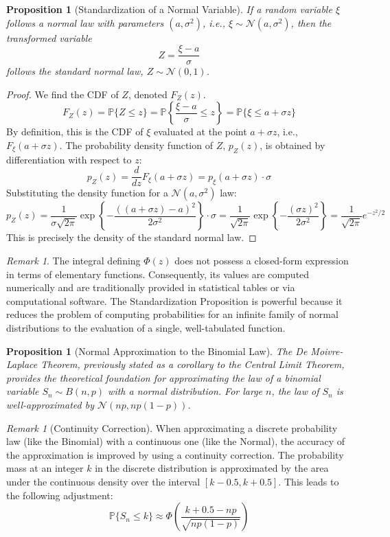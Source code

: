 \documentclass[12pt, openany]{book}
\theoremstyle{definition}
\theoremstyle{plain}
\newtheorem{proposition}[definition]{Proposition}
\theoremstyle{remark}
\newtheorem{remark}[definition]{Remark}
\newcommand{\probP}{\mathbb{P}}
\begin{document}
\begin{proposition}[Standardization of a Normal Variable]
If a random variable $\xi$ follows a normal law with parameters $(a, \sigma^2)$, i.e., $\xi \sim \mathcal{N}(a, \sigma^2)$, then the transformed variable
$$ Z = \frac{\xi - a}{\sigma} $$
follows the standard normal law, $Z \sim \mathcal{N}(0,1)$.
\end{proposition}
\begin{proof}
We find the CDF of $Z$, denoted $F_Z(z)$.
$$ F_Z(z) = \probP\{Z \le z\} = \probP\left\{\frac{\xi - a}{\sigma} \le z\right\} = \probP\{\xi \le a + \sigma z\} $$
By definition, this is the CDF of $\xi$ evaluated at the point $a + \sigma z$, i.e., $F_\xi(a + \sigma z)$. The probability density function of $Z$, $p_Z(z)$, is obtained by differentiation with respect to $z$:
$$ p_Z(z) = \frac{d}{dz} F_\xi(a + \sigma z) = p_\xi(a + \sigma z) \cdot \sigma $$
Substituting the density function for a $\mathcal{N}(a, \sigma^2)$ law:
$$ p_Z(z) = \frac{1}{\sigma\sqrt{2\pi}} \exp\left\{-\frac{((a+\sigma z)-a)^2}{2\sigma^2}\right\} \cdot \sigma = \frac{1}{\sqrt{2\pi}} \exp\left\{-\frac{(\sigma z)^2}{2\sigma^2}\right\} = \frac{1}{\sqrt{2\pi}} e^{-z^2/2} $$
This is precisely the density of the standard normal law.
\end{proof}

\begin{remark}
The integral defining $\Phi(z)$ does not possess a closed-form expression in terms of elementary functions. Consequently, its values are computed numerically and are traditionally provided in statistical tables or via computational software. The Standardization Proposition is powerful because it reduces the problem of computing probabilities for an infinite family of normal distributions to the evaluation of a single, well-tabulated function.
\end{remark}

\begin{proposition}[Normal Approximation to the Binomial Law]
The De Moivre-Laplace Theorem, previously stated as a corollary to the Central Limit Theorem, provides the theoretical foundation for approximating the law of a binomial variable $S_n \sim B(n,p)$ with a normal distribution. For large $n$, the law of $S_n$ is well-approximated by $\mathcal{N}(np, np(1-p))$.
\end{proposition}

\begin{remark}[Continuity Correction]
When approximating a discrete probability law (like the Binomial) with a continuous one (like the Normal), the accuracy of the approximation is improved by using a continuity correction. The probability mass at an integer $k$ in the discrete distribution is approximated by the area under the continuous density over the interval $[k-0.5, k+0.5]$. This leads to the following adjustment:
$$ \probP\{S_n \le k\} \approx \Phi\left(\frac{k+0.5 - np}{\sqrt{np(1-p)}}\right) $$
\end{remark}
\end{document}
